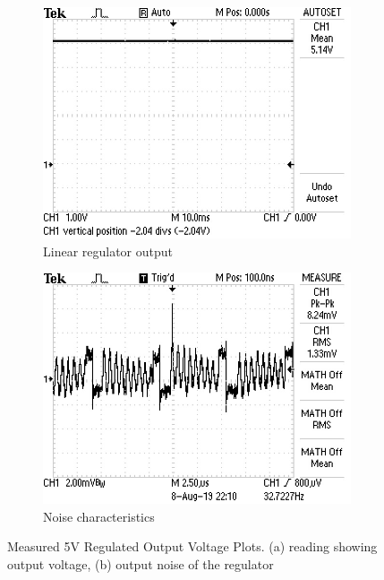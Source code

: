\begin{figure}
 \centering
     \begin{subfigure}[]{0.45\textwidth}
        \centering
         \includegraphics[width=1\linewidth]{./Figures/5V_output_voltage.JPG}
		    \caption{Linear regulator output} \label{subfig:5V_reg_output}
     \end{subfigure}
      \begin{subfigure}[]{0.45\textwidth}
              \centering
\includegraphics[width=1\linewidth]{./Figures/5V_output_noise.JPG}%
		    \caption{Noise characteristics}  \label{subfig:5V_reg_noise}
     \end{subfigure}
   \caption[Measured 5V Regulated Output Voltage Plots]{Measured 5V Regulated Output Voltage Plots. (a) reading showing output voltage, (b) output noise of the regulator}
    \label{fig:regulator_simulation_results_box}
 \end{figure}







